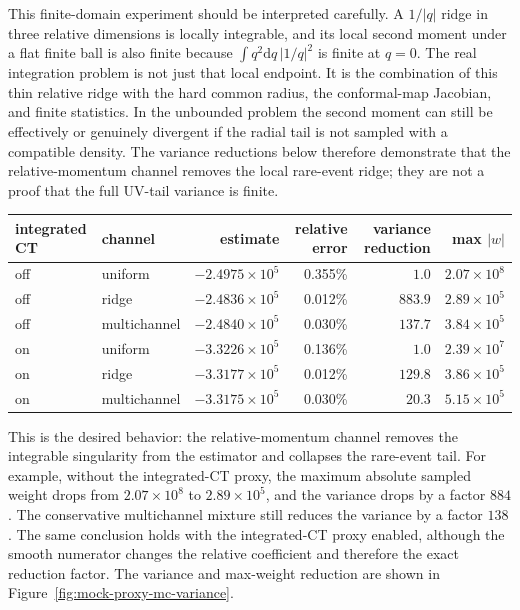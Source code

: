 \documentclass[11pt]{article}
\newcommand{\dd}{\mathrm{d}}
\begin{document}
This finite-domain experiment should be interpreted carefully.  A
$1/|q|$ ridge in three relative dimensions is locally integrable, and its
local second moment under a flat finite ball is also finite because
$\int q^2\dd q\, |1/q|^2$ is finite at $q=0$.  The real integration problem is
not just that local endpoint.  It is the combination of this thin relative
ridge with the hard common radius, the conformal-map Jacobian, and finite
statistics.  In the unbounded problem the second moment can still be
effectively or genuinely divergent if the radial tail is not sampled with a
compatible density.  The variance reductions below therefore demonstrate that
the relative-momentum channel removes the local rare-event ridge; they are not
a proof that the full UV-tail variance is finite.

\begin{center}
\scriptsize
\begin{tabular}{llrrrr}
\toprule
integrated CT & channel & estimate & relative error & variance reduction &
max $|w|$\\
\midrule
off & uniform & $-2.4975\times10^5$ & 0.355\% & $1.0$ & $2.07\times10^8$\\
off & ridge & $-2.4836\times10^5$ & 0.012\% & $883.9$ & $2.89\times10^5$\\
off & multichannel & $-2.4840\times10^5$ & 0.030\% & $137.7$ & $3.84\times10^5$\\
on & uniform & $-3.3226\times10^5$ & 0.136\% & $1.0$ & $2.39\times10^7$\\
on & ridge & $-3.3177\times10^5$ & 0.012\% & $129.8$ & $3.86\times10^5$\\
on & multichannel & $-3.3175\times10^5$ & 0.030\% & $20.3$ & $5.15\times10^5$\\
\bottomrule
\end{tabular}
\end{center}

This is the desired behavior: the relative-momentum channel removes the
integrable singularity from the estimator and collapses the rare-event tail.
For example, without the integrated-CT proxy, the maximum absolute sampled
weight drops from $2.07\times10^8$ to $2.89\times10^5$, and the variance drops
by a factor $884$.  The conservative multichannel mixture still reduces the
variance by a factor $138$.  The same conclusion holds with the integrated-CT
proxy enabled, although the smooth numerator changes the relative coefficient
and therefore the exact reduction factor.
The variance and max-weight reduction are shown in
Figure~\ref{fig:mock-proxy-mc-variance}.
\end{document}
